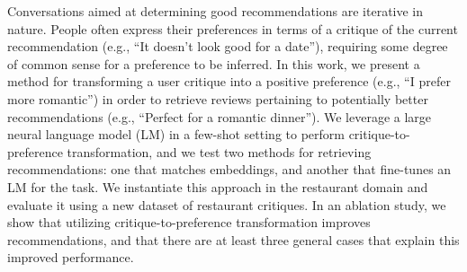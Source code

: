 Conversations aimed at determining good recommendations are iterative in nature. People often express their preferences in terms of a critique of the current recommendation (e.g., ``It doesn't look good for a date''), requiring some degree of common sense for a preference to be inferred. In this work, we present a method for transforming a user critique into a positive preference (e.g., ``I prefer more romantic'') in order to retrieve reviews pertaining to potentially better recommendations (e.g., ``Perfect for a romantic dinner''). We leverage a large neural language model (LM) in a few-shot setting to perform critique-to-preference transformation, and we test two methods for retrieving recommendations: one that matches embeddings, and another that fine-tunes an LM for the task. We instantiate this approach in the restaurant domain and evaluate it using a new dataset of restaurant critiques. In an ablation study, we show that utilizing critique-to-preference transformation improves recommendations, and that there are at least three general cases that explain this improved performance.
